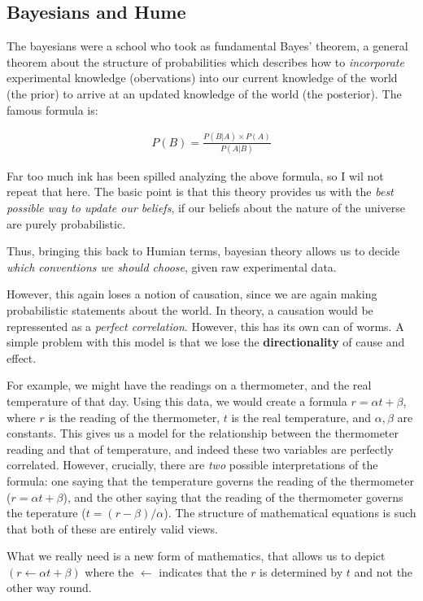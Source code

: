 \documentclass{article}
\begin{document}
\subsection{Bayesians and Hume}
The bayesians were a school who took as fundamental Bayes' theorem, a general
theorem about the structure of probabilities which describes how to \emph{incorporate}
experimental knowledge (obervations) into our current knowledge of the world (the prior)
to arrive at an updated knowledge of the world (the posterior). The famous formula is:

\begin{align*}
    P(B) = \frac{P(B|A) \times P(A) }{P(A|B)}
\end{align*}

Far too much ink has been spilled analyzing the above formula, so I wil not
repeat that here. The basic point is that this theory provides us with the
\textit{best possible way to update our beliefs}, if our beliefs about the
nature of the universe are purely probabilistic.

Thus, bringing this back to Humian terms, bayesian theory allows us to decide
\textit{which conventions we should choose}, given raw experimental data.

However, this again loses a notion of causation, since we are again making
probabilistic statements about the world. In theory, a causation would be
repressented as a \textit{perfect correlation}. However, this has its own can
of worms. A simple problem with this model is that we lose the \textbf{directionality}
of cause and effect.

For example, we might have the readings on a thermometer, and the real temperature
of that day. Using this data, we would create a formula $r = \alpha t + \beta$,
where $r$ is the reading of the thermometer, $t$ is the real temperature, and
$\alpha, \beta$ are constants. This gives us a model for the relationship between
the thermometer reading and that of temperature, and indeed these two variables
are perfectly correlated. However, crucially, there are \textit{two} possible
interpretations of the formula: one saying that the temperature governs the
reading of the thermometer ($r = \alpha t + \beta$), and the other saying that
the reading of the thermometer governs the teperature ($t = (r - \beta) /
\alpha$). The structure of mathematical equations is such that both of these
are entirely valid views.

What we really need is a new form of mathematics, that allows us to depict
$(r \leftarrow \alpha t + \beta )$ where the $\leftarrow$ indicates that
the $r$ is determined by $t$ and not the other way round.
\end{document}

